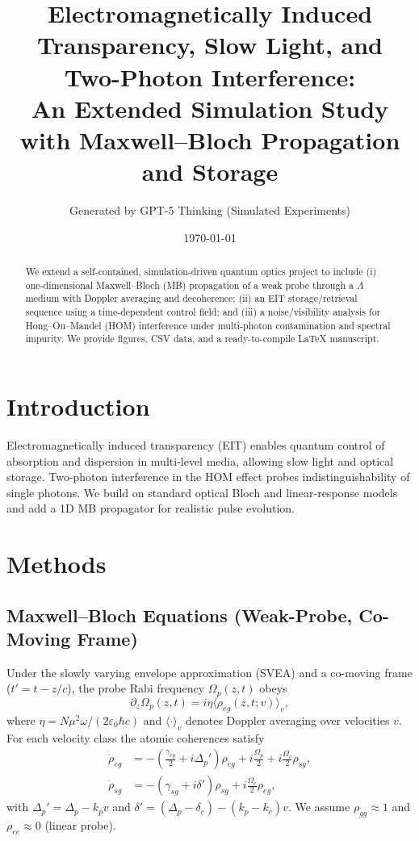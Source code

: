 \documentclass[11pt]{article}
\title{Electromagnetically Induced Transparency, Slow Light, and Two-Photon Interference:\\
An Extended Simulation Study with Maxwell--Bloch Propagation and Storage}
\author{Generated by GPT-5 Thinking (Simulated Experiments)}
\date{\today}
\begin{document}
\maketitle

\begin{abstract}
We extend a self-contained, simulation-driven quantum optics project to include (i) one-dimensional Maxwell--Bloch (MB) propagation of a weak probe through a $\Lambda$ medium with Doppler averaging and decoherence; (ii) an EIT storage/retrieval sequence using a time-dependent control field; and (iii) a noise/visibility analysis for Hong--Ou--Mandel (HOM) interference under multi-photon contamination and spectral impurity. We provide figures, CSV data, and a ready-to-compile \LaTeX{} manuscript.
\end{abstract}

\section{Introduction}
Electromagnetically induced transparency (EIT) enables quantum control of absorption and dispersion in multi-level media, allowing slow light and optical storage. Two-photon interference in the HOM effect probes indistinguishability of single photons. We build on standard optical Bloch and linear-response models and add a 1D MB propagator for realistic pulse evolution.

\section{Methods}
\subsection{Maxwell--Bloch Equations (Weak-Probe, Co-Moving Frame)}
Under the slowly varying envelope approximation (SVEA) and a co-moving frame ($t' = t - z/c$), the probe Rabi frequency $\Omega_p(z,t)$ obeys
\begin{equation}
\partial_z \Omega_p(z,t) = i \eta \langle \rho_{eg}(z,t; v)\rangle_v ,
\end{equation}
where $\eta = N \mu^2 \omega/(2\varepsilon_0\hbar c)$ and $\langle\cdot\rangle_v$ denotes Doppler averaging over velocities $v$.
For each velocity class the atomic coherences satisfy
\begin{align}
\dot{\rho}_{eg} &= -\left(\frac{\gamma_{eg}}{2} + i\Delta_p'\right)\rho_{eg} + i\frac{\Omega_p}{2} + i\frac{\Omega_c}{2}\rho_{sg},\\
\dot{\rho}_{sg} &= -\left(\gamma_{sg} + i\delta'\right)\rho_{sg} + i\frac{\Omega_c}{2}\rho_{eg},
\end{align}
with $\Delta_p' = \Delta_p - k_p v$ and $\delta' = (\Delta_p - \delta_c) - (k_p - k_c)v$. We assume $\rho_{gg}\approx 1$ and $\rho_{ee}\approx 0$ (linear probe).
\end{document}
